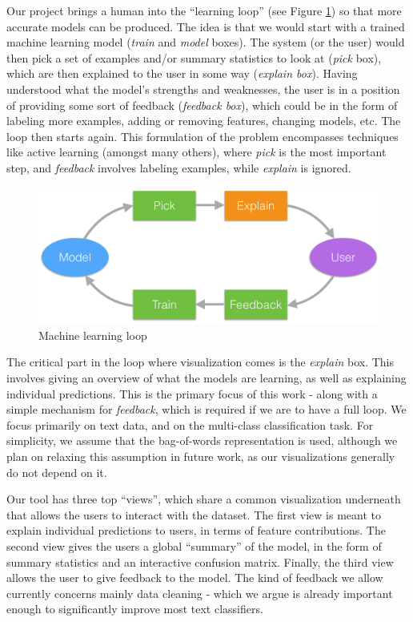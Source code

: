 \documentclass{chi2009}
\begin{document}
Our project brings a human into the “learning loop” (see Figure \ref{hmloop}) so
that more accurate models can be produced. The idea is that we would start with
a trained machine learning
model (\emph{train} and \emph{model} boxes). The system (or the user) would then
pick a set of examples and/or summary statistics to look at (\emph{pick} box),
which are then explained to the user in some way (\emph{explain box}). Having
understood what the model's strengths and weaknesses, the user is in a position
of providing some sort of feedback (\emph{feedback box}), which could be in the
form of labeling more examples, adding or removing features, changing models,
etc. The loop then starts again. This formulation of the problem encompasses
techniques like active learning (amongst many others), where \emph{pick} is the
most important step, and \emph{feedback} involves labeling examples, while
\emph{explain} is ignored.

\begin{figure}[hb]
\includegraphics[width=.5\textwidth]{feedback_loop_cropped.pdf}
\caption{Machine learning loop}
\label{hmloop}
\end{figure}

The critical part in the loop where visualization comes is the \emph{explain}
box. This involves giving an overview of what the models are learning, as well
as explaining individual predictions. This is the primary focus of this work -
along with a simple mechanism for \emph{feedback}, which is required if we are
to have a full loop. We focus primarily on text data, and on the multi-class
classification task. For simplicity, we assume that the bag-of-words
representation is used, although we plan on relaxing this assumption in future
work, as our visualizations generally do not depend on it.

Our tool has three top ``views'', which share a common visualization underneath
that allows the users to interact with the dataset. The first view is meant to explain
individual predictions to users, in terms of feature contributions. The second
view gives the users a global ``summary'' of the model, in the form of summary
statistics and an interactive confusion matrix. Finally, the third view allows
the user to give feedback to the model. The kind of feedback we allow currently
concerns mainly data cleaning - which we argue is already important enough to
significantly improve most text classifiers.
\end{document}
